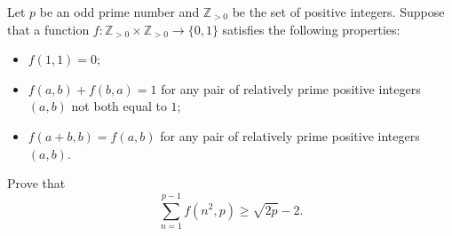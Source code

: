 Let $p$ be an odd prime number and $\mathbb{Z}_{>0}$ be the set of positive integers. Suppose that a function $f \colon \mathbb{Z}_{>0} \times \mathbb{Z}_{>0} \to \{0, 1\}$ satisfies the following properties:
\begin{itemize}
\item $f(1, 1) = 0$;
\item $f(a, b) + f(b, a) = 1$ for any pair of relatively prime positive integers $(a, b)$ not both equal to $1$;
\item $f(a + b, b) = f(a, b)$ for any pair of relatively prime positive integers $(a, b)$.
\end{itemize}
Prove that
\[
\sum_{n=1}^{p-1} f(n^2, p) \geq \sqrt{2p} - 2.
\]
